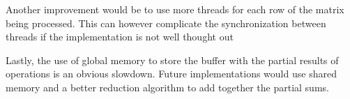 \documentclass[conference]{IEEEtran}
\begin{document}
Another improvement would be to use more threads for each row of the matrix being processed. This can however complicate the synchronization between threads if the implementation is not well thought out

Lastly, the use of global memory to store the buffer with the partial results of operations is an obvious slowdown. Future implementations would use shared memory and a better reduction algorithm to add together the partial sums.



\end{document}
